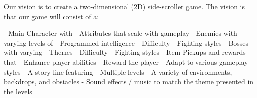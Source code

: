 Our vision is to create a two-dimensional (2D) side-scroller game.
The vision is that our game will consist of a:

\indent - Main Character with
\newline\indent \indent - Attributes that scale with gameplay
\newline\indent - Enemies with varying levels of
\newline\indent \indent - Programmed intelligence
\newline\indent \indent - Difficulty
\newline\indent \indent - Fighting styles
\newline\indent - Bosses with varying
\newline\indent \indent - Themes
\newline\indent \indent - Difficulty
\newline\indent \indent - Fighting styles
\newline\indent - Item Pickups and rewards that
\newline\indent \indent - Enhance player abilities
\newline\indent \indent - Reward the player
\newline\indent \indent - Adapt to various gameplay styles
\newline\indent - A story line featuring
\newline\indent \indent - Multiple levels
\newline\indent \indent - A variety of environments, backdrops, and obstacles
\newline\indent \indent - Sound effects / music to match the theme presented in the levels


